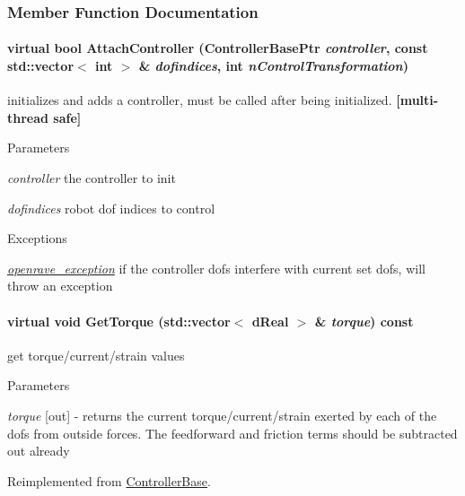 \subsubsection{Member Function Documentation}
\hypertarget{classOpenRAVE_1_1MultiController_a908295878cfb74d5e6ef193e2e7c6cbc}{
\paragraph[{AttachController}]{\setlength{\rightskip}{0pt plus 5cm}virtual bool AttachController (ControllerBasePtr {\em controller}, \/  const std::vector$<$ int $>$ \& {\em dofindices}, \/  int {\em nControlTransformation})}\hfill}
\label{classOpenRAVE_1_1MultiController_a908295878cfb74d5e6ef193e2e7c6cbc}


initializes and adds a controller, must be called after being initialized. {\bfseries \mbox{[}multi-\/thread safe\mbox{]}} 


\begin{DoxyParams}{Parameters}
\item[{\em controller}]the controller to init \item[{\em dofindices}]robot dof indices to control \end{DoxyParams}

\begin{DoxyExceptions}{Exceptions}
\item[{\em \hyperlink{classOpenRAVE_1_1openrave__exception}{openrave\_\-exception}}]if the controller dofs interfere with current set dofs, will throw an exception \end{DoxyExceptions}
\hypertarget{classOpenRAVE_1_1MultiController_aa9cb5e097c6ecb5d0b157f9b7c581085}{
\paragraph[{GetTorque}]{\setlength{\rightskip}{0pt plus 5cm}virtual void GetTorque (std::vector$<$ dReal $>$ \& {\em torque}) const}\hfill}
\label{classOpenRAVE_1_1MultiController_aa9cb5e097c6ecb5d0b157f9b7c581085}
get torque/current/strain values 
\begin{DoxyParams}{Parameters}
\item[{\em torque}]\mbox{[}out\mbox{]} -\/ returns the current torque/current/strain exerted by each of the dofs from outside forces. The feedforward and friction terms should be subtracted out already \end{DoxyParams}


Reimplemented from \hyperlink{classOpenRAVE_1_1ControllerBase_a5850b39ddc68841ef2961c2eb7bf7b8f}{ControllerBase}.

